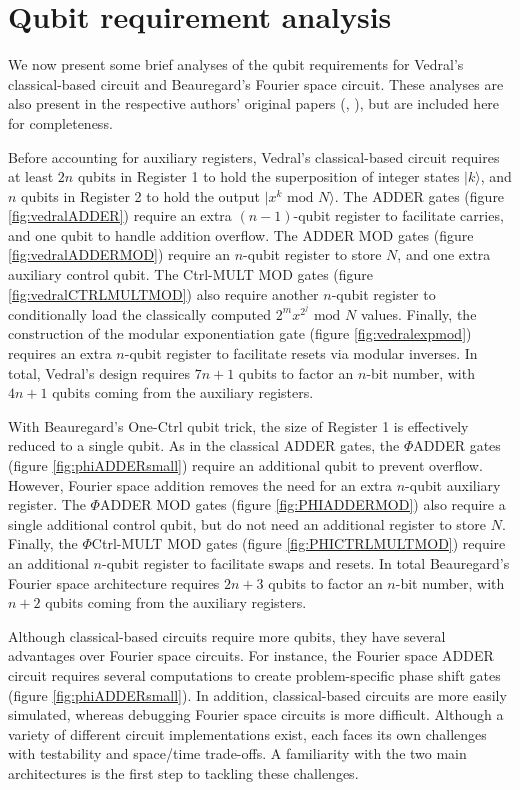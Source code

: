 \documentclass{article}
\begin{document}
\section{Qubit requirement analysis}
We now present some brief analyses of the qubit requirements for Vedral's classical-based circuit and Beauregard's Fourier space circuit. These analyses are also present in the respective authors' original papers (\cite{VBE95}, \cite{Bea03}), but are included here for completeness. 

Before accounting for auxiliary registers, Vedral's classical-based circuit requires at least $2n$ qubits in Register 1 to hold the superposition of integer states $|k\rangle$, and $n$ qubits in Register 2 to hold the output $|x^k \text{ mod } N\rangle$. The ADDER gates (figure \ref{fig:vedralADDER}) require an extra $(n-1)$-qubit register to facilitate carries, and one qubit to handle addition overflow. The ADDER MOD gates (figure \ref{fig:vedralADDERMOD}) require an $n$-qubit register to store $N$, and one extra auxiliary control qubit. The Ctrl-MULT MOD gates (figure \ref{fig:vedralCTRLMULTMOD}) also require another $n$-qubit register to conditionally load the classically computed $2^m x^{2^j} \text{ mod }N$ values. Finally, the construction of the modular exponentiation gate (figure \ref{fig:vedralexpmod}) requires an extra $n$-qubit register to facilitate resets via modular inverses. In total, Vedral's design requires $7n+1$ qubits to factor an $n$-bit number, with $4n+1$ qubits coming from the auxiliary registers. 

With Beauregard's One-Ctrl qubit trick, the size of Register 1 is effectively reduced to a single qubit. As in the classical ADDER gates, the $\Phi$ADDER gates (figure \ref{fig:phiADDERsmall}) require an additional qubit to prevent overflow. However, Fourier space addition removes the need for an extra $n$-qubit auxiliary register. The $\Phi$ADDER MOD gates (figure \ref{fig:PHIADDERMOD}) also require a single additional control qubit, but do not need an additional register to store $N$. Finally, the $\Phi$Ctrl-MULT MOD gates (figure \ref{fig:PHICTRLMULTMOD}) require an additional $n$-qubit register to facilitate swaps and resets. In total Beauregard's Fourier space architecture requires $2n+3$ qubits to factor an $n$-bit number, with $n+2$ qubits coming from the auxiliary registers. 

Although classical-based circuits require more qubits, they have several advantages over Fourier space circuits. For instance, the Fourier space ADDER circuit requires several computations to create problem-specific phase shift gates (figure \ref{fig:phiADDERsmall}). In addition, classical-based circuits are more easily simulated, whereas debugging Fourier space circuits is more difficult. Although a variety of different circuit implementations exist, each faces its own challenges with testability and space/time trade-offs. A familiarity with the two main architectures is the first step to tackling these challenges. 
\end{document}
